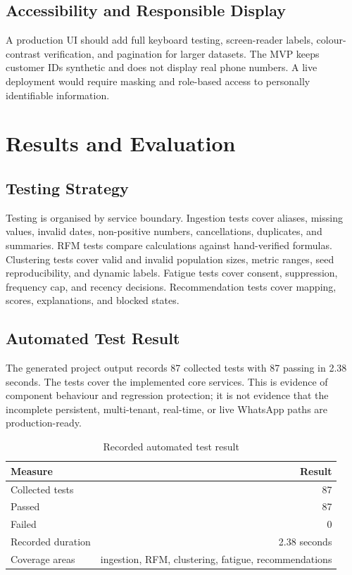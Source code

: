 \documentclass[12pt,a4paper]{report}
\begin{document}
\section{Accessibility and Responsible Display}
A production UI should add full keyboard testing, screen-reader labels, colour-contrast verification, and pagination for larger datasets. The MVP keeps customer IDs synthetic and does not display real phone numbers. A live deployment would require masking and role-based access to personally identifiable information.

\chapter{Results and Evaluation}
\section{Testing Strategy}
Testing is organised by service boundary. Ingestion tests cover aliases, missing values, invalid dates, non-positive numbers, cancellations, duplicates, and summaries. RFM tests compare calculations against hand-verified formulas. Clustering tests cover valid and invalid population sizes, metric ranges, seed reproducibility, and dynamic labels. Fatigue tests cover consent, suppression, frequency cap, and recency decisions. Recommendation tests cover mapping, scores, explanations, and blocked states.

\section{Automated Test Result}
The generated project output records 87 collected tests with 87 passing in 2.38 seconds. The tests cover the implemented core services. This is evidence of component behaviour and regression protection; it is not evidence that the incomplete persistent, multi-tenant, real-time, or live WhatsApp paths are production-ready.

\begin{table}[H]
\centering
\caption{Recorded automated test result}\label{tab:tests}
\begin{tabular}{p{}r}
\toprule
Measure & Result\\\midrule
Collected tests & 87\\
Passed & 87\\
Failed & 0\\
Recorded duration & 2.38 seconds\\
Coverage areas & ingestion, RFM, clustering, fatigue, recommendations\\\bottomrule
\end{tabular}
\end{table}
\end{document}

